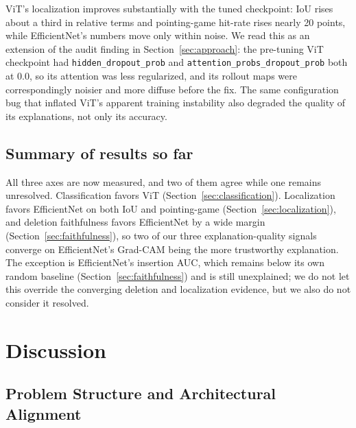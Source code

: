 \documentclass[10pt,twocolumn,letterpaper]{article}
\begin{document}
ViT's localization improves substantially with the tuned checkpoint: IoU
rises about a third in relative terms and pointing-game hit-rate rises
nearly 20 points, while EfficientNet's numbers move only within noise. We
read this as an extension of the audit finding in
Section~\ref{sec:approach}: the pre-tuning ViT checkpoint had
\texttt{hidden\_dropout\_prob} and \texttt{attention\_probs\_dropout\_prob}
both at $0.0$, so its attention was less regularized, and its rollout maps
were correspondingly noisier and more diffuse before the fix. The same
configuration bug that inflated ViT's apparent training instability also
degraded the quality of its explanations, not only its accuracy.

\subsection{Summary of results so far}
\label{sec:results-summary}

All three axes are now measured, and two of them agree while one remains
unresolved. Classification favors ViT (Section~\ref{sec:classification}).
Localization favors EfficientNet on both IoU and pointing-game
(Section~\ref{sec:localization}), and deletion faithfulness favors
EfficientNet by a wide margin (Section~\ref{sec:faithfulness}), so two of our
three explanation-quality signals converge on EfficientNet's Grad-CAM being
the more trustworthy explanation. The exception is EfficientNet's insertion
AUC, which remains below its own random baseline
(Section~\ref{sec:faithfulness}) and is still unexplained; we do not let this
override the converging deletion and localization evidence, but we also do
not consider it resolved.

\section{Discussion}
\label{sec:discussion}

\subsection{Problem Structure and Architectural Alignment}
\end{document}
